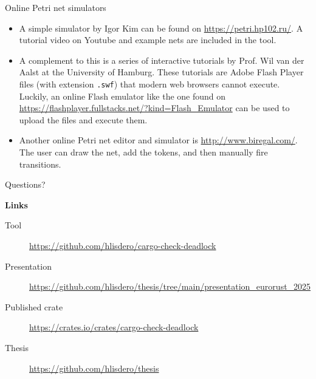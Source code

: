\documentclass{beamer}
\begin{document}
\begin{frame}{Online Petri net simulators}
  \begin{itemize}
    \item A simple simulator by Igor Kim can be found on \url{https://petri.hp102.ru/}.
          A tutorial video on Youtube and example nets are included in the tool.
    \item A complement to this is a series of interactive tutorials by Prof. Wil van der Aalst
          at the University of Hamburg. These tutorials are Adobe Flash Player files (with extension \texttt{.swf})
          that modern web browsers cannot execute.
          Luckily, an online Flash emulator like the one found on \url{https://flashplayer.fullstacks.net/?kind=Flash_Emulator}
          can be used to upload the files and execute them.
    \item Another online Petri net editor and simulator is \url{http://www.biregal.com/}.
          The user can draw the net, add the tokens, and then manually fire transitions.
  \end{itemize}
\end{frame}

\begin{frame}{}
  \huge
  \centering
  Questions?


  \vfill
  \raggedright
  \normalsize
  \textbf{Links}

  \scriptsize

  \begin{description}
    \item [Tool] \url{https://github.com/hlisdero/cargo-check-deadlock}
    \item [Presentation] \url{https://github.com/hlisdero/thesis/tree/main/presentation_eurorust_2025}
    \item [Published crate] \url{https://crates.io/crates/cargo-check-deadlock}
    \item [Thesis] \url{https://github.com/hlisdero/thesis}
  \end{description}
\end{frame}
\end{document}
